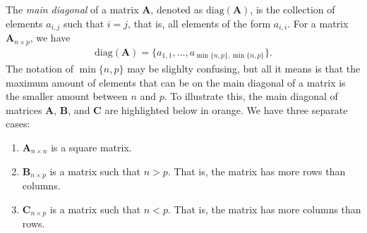 \documentclass[10pt]{article}
\newcommand{\mydef}[1]{\textcolor{SteelBlue3}{\textit{#1}}} %
\begin{document}
The \mydef{main diagonal} of a matrix $\mathbf{A}$, denoted as $\mathrm{diag}(\mathbf{A})$, is the collection of elements $a_{i,j}$ such that $i=j$, that is, all elements of the form $a_{i,i}$. For a matrix $\mathbf{A}_{n \times p}$, we have \begin{align}
    \label{diagonal}
    \mathrm{diag}(\mathbf{A}) = \big\{ a_{1,1}, \ldots, a_{\min\{n,p\},\min\{n,p\}} \big\}.
\end{align}
The notation of $\min\{n,p\}$ may be slighlty confusing, but all it means is that the maximum amount of elements that can be on the main diagonal of a matrix is the smaller amount between $n$ and $p$. To illustrate this, the main diagonal of matrices $\mathbf{A}$, $\mathbf{B}$, and $\mathbf{C}$ are highlighted below in orange. We have three separate cases:
\begin{enumerate}
    \item $\mathbf{A}_{n \times n}$ is a square matrix.
    \item $\mathbf{B}_{n \times p}$ is a matrix such that $n>p$. That is, the matrix has more rows than columns. 
    \item $\mathbf{C}_{n \times p}$ is a matrix such that $n<p$. That is, the matrix has more columns than rows. 
\end{enumerate}
\end{document}
